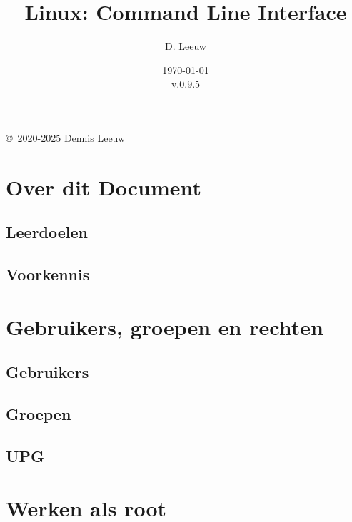 \documentclass[a4paper,12pt,twoside,openright,titlepage]{book}
\author{D. Leeuw}
\title{Linux: Command Line Interface}
\date{\today\\v.0.9.5}
\begin{document}

\maketitle

\copyright\ 2020-2025 Dennis Leeuw\\




\frontmatter
\chapter{Over dit Document}
\section{Leerdoelen}

\section{Voorkennis}

%
%

\tableofcontents

\mainmatter

\chapter{Gebruikers, groepen en rechten}

\section{Gebruikers}

\section{Groepen}

\section{UPG}

\chapter{Werken als root}

\end{document}
